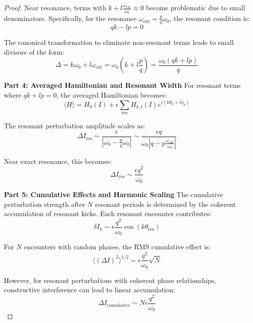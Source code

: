 \begin{proof}
Near resonance, terms with $k + l\frac{\omega_{\text{ext}}}{\omega_0} \approx 0$ become problematic due to small denominators. Specifically, for the resonance $\omega_{\text{ext}} = \frac{p}{q}\omega_0$, the resonant condition is:
\begin{equation}
qk - lp = 0
\end{equation}

The canonical transformation to eliminate non-resonant terms leads to small divisors of the form:
\begin{equation}
\Delta = k\omega_0 + l\omega_{\text{ext}} = \omega_0(k + l\frac{p}{q}) = \frac{\omega_0(qk + lp)}{q}
\end{equation}

\textbf{Part 4: Averaged Hamiltonian and Resonant Width}
For resonant terms where $qk + lp = 0$, the averaged Hamiltonian becomes:
\begin{equation}
\langle H \rangle = H_0(I) + \epsilon \sum_{\text{res}} H_{k,l}(I) e^{i(k\theta_0 + l\phi_0)}
\end{equation}

The resonant perturbation amplitude scales as:
\begin{equation}
\Delta I_{\text{res}} \sim \frac{\epsilon}{|\omega_0 - \frac{p}{q}\omega_0|} \sim \frac{\epsilon q}{\omega_0 |q - p\frac{\omega_{\text{ext}}}{\omega_0}|}
\end{equation}

Near exact resonance, this becomes:
\begin{equation}
\Delta I_{\text{res}} \sim \frac{\epsilon q^2}{\omega_0}
\end{equation}

\textbf{Part 5: Cumulative Effects and Harmonic Scaling}
The cumulative perturbation strength after $N$ resonant periods is determined by the coherent accumulation of resonant kicks. Each resonant encounter contributes:
\begin{equation}
\delta I_k \sim \epsilon \frac{q^2}{\omega_0} \cos(k\theta_{\text{res}})
\end{equation}

For $N$ encounters with random phases, the RMS cumulative effect is:
\begin{equation}
\langle (\Delta I)^2 \rangle^{1/2} \sim \epsilon \frac{q^2}{\omega_0} \sqrt{N}
\end{equation}

However, for resonant perturbations with coherent phase relationships, constructive interference can lead to linear accumulation:
\begin{equation}
\Delta I_{\text{cumulative}} \sim N \epsilon \frac{q^2}{\omega_0}
\end{equation}


\end{proof}
